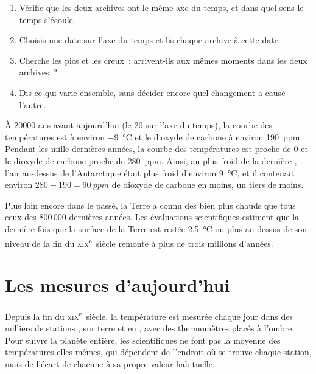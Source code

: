 \begin{method}
\begin{enumerate}
  \item Vérifie que les deux archives ont le même axe du temps, et dans
        quel sens le temps s'écoule.
  \item Choisis une date sur l'axe du temps et lis chaque archive à cette
        date.
  \item Cherche les pics et les creux~: arrivent-ils aux mêmes moments
        dans les deux archives~?
  \item Dis ce qui varie ensemble, sans décider encore quel changement a
        causé l'autre.
\end{enumerate}
\end{method}

\begin{example}
À \num{20000} ans avant aujourd'hui (le 20 sur l'axe du temps), la courbe
des températures est à environ \qty{-9}{\degreeCelsius} et le dioxyde de
carbone à environ \qty{190}{ppm}. Pendant les mille dernières années, la
courbe des températures est proche de 0 et le dioxyde de carbone proche de
\qty{280}{ppm}. Ainsi, au plus froid de la dernière , l'air
au-dessus de l'Antarctique était plus froid d'environ
\qty{9}{\degreeCelsius}, et il contenait environ
$280 - 190 = \qty{90}{ppm}$ de dioxyde de carbone en moins, un tiers de
moins.
\end{example}

Plus loin encore dans le passé, la Terre a connu des  bien plus
chauds que tous ceux des 800\,000 dernières années. Les évaluations
scientifiques estiment que la dernière fois que la surface de la Terre
est restée \qty{2.5}{\degreeCelsius} ou plus au-dessus de son niveau de la
fin du \textsc{xix}\textsuperscript{e}~siècle remonte à plus de trois
millions d'années.

\section{Les mesures d'aujourd'hui}

Depuis la fin du \textsc{xix}\textsuperscript{e}~siècle, la température
est mesurée chaque jour dans des milliers de stations , sur
terre et en , avec des thermomètres placés à l'ombre. Pour suivre la
planète entière, les scientifiques ne font pas la moyenne des températures
elles-mêmes, qui dépendent de l'endroit où se trouve chaque station, mais
de l'écart de chacune à sa propre valeur habituelle.

